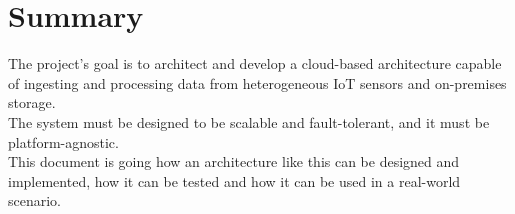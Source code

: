 \cleardoublepage
{}
{}
\begingroup
\let\clearpage\relax
\let\cleardoublepage\relax
\let\cleardoublepage\relax

\chapter*{Summary}

The project's goal is to architect and develop a cloud-based architecture capable of ingesting and processing data from heterogeneous IoT sensors and on-premises storage.\\
The system must be designed to be scalable and fault-tolerant, and it must be platform-agnostic.\\
This document is going how an architecture like this can be designed and implemented, how it can be tested and how it can be used in a real-world scenario.\\




\endgroup

\vfill
